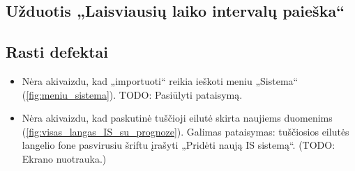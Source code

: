 \subsection{Užduotis „Laisviausių laiko intervalų paieška“}

\subsection{Rasti defektai}

\begin{itemize}
  \item Nėra akivaizdu, kad „importuoti“ reikia ieškoti meniu „Sistema“
    (\ref{fig:meniu_sistema}). TODO: Pasiūlyti pataisymą.
  \item Nėra akivaizdu, kad paskutinė tuščioji eilutė skirta naujiems
    duomenims (\ref{fig:visas_langas_IS_su_prognoze}). Galimas pataisymas:
    tuščiosios eilutės langelio fone pasvirusiu šriftu įrašyti
    „Pridėti naują IS sistemą“. (TODO: Ekrano nuotrauka.)
\end{itemize}

